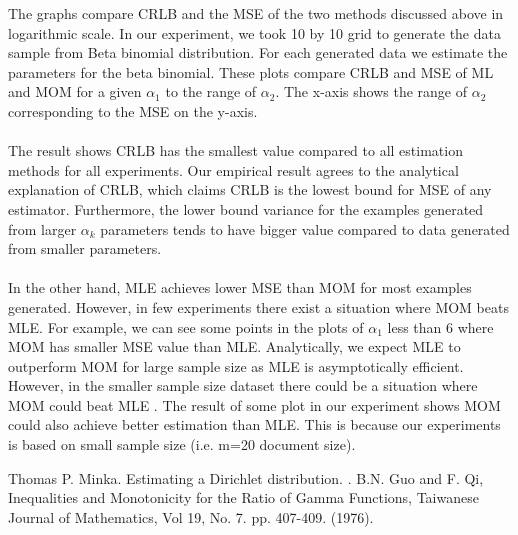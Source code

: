 \documentclass{article} %
\newcommand{\?}{\stackrel{?}{=}}
\begin{document}
The graphs compare CRLB and the MSE of the two methods discussed above in logarithmic scale. In our experiment, we took 10 by 10 grid to generate the data sample from Beta binomial distribution. For each generated data we estimate the parameters for the beta binomial. These plots compare CRLB and MSE of ML and MOM for a given $\alpha_1$  to the range of $\alpha_2$. The x-axis shows the range of $\alpha_2$ corresponding to the MSE on the y-axis.\\
\\ 
The result shows CRLB has the smallest value compared to all estimation methods for all experiments. Our empirical result agrees to the analytical explanation of CRLB, which claims CRLB is the lowest bound for MSE of any estimator. Furthermore, the lower bound variance for the examples generated from larger $\alpha_k$ parameters tends to have bigger value compared to data generated from smaller parameters.\\
\\
In the other hand, MLE achieves lower MSE than MOM  for most examples generated. However, in few experiments there exist a situation where MOM beats MLE. For example, we can see some points in the plots of $\alpha_1$ less than 6 where MOM has smaller MSE value than MLE. Analytically, we expect MLE to outperform MOM for large sample size as MLE is asymptotically efficient. However, in the smaller sample size dataset there could be a situation where MOM could beat MLE . The result of some plot in our experiment shows MOM could also achieve better estimation than MLE. This is because our experiments is based on small sample size (i.e. m=20 document size).
\begin{thebibliography}{9}

Thomas P. Minka.
\newblock Estimating a Dirichlet distribution.
.
 B.N. Guo and F. Qi, 
\newblock Inequalities and Monotonicity for the Ratio of Gamma Functions,
\newblock Taiwanese Journal of Mathematics, 
\newblock Vol 19, No. 7. pp. 407-409. (1976).
\end{thebibliography}
\end{document}
